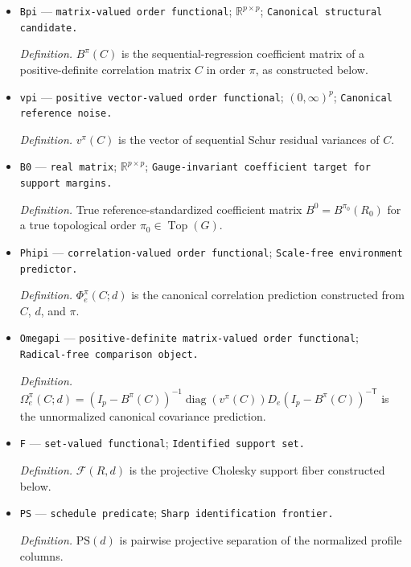 \documentclass{article}
\begin{document}
\begin{itemize}
  \item \texttt{Bpi} --- \texttt{matrix-\allowbreak{}valued order functional}; \(\mathbb R^{p\times p}\); \texttt{Canonical structural candidate.}
  \par\smallskip\noindent\emph{Definition.} \(B^{\pi}(C)\) is the sequential-regression coefficient matrix of a positive-definite correlation matrix \(C\) in order \(\pi\), as constructed below.
  \item \texttt{vpi} --- \texttt{positive vector-\allowbreak{}valued order functional}; \((0,\infty)^p\); \texttt{Canonical reference noise.}
  \par\smallskip\noindent\emph{Definition.} \(v^{\pi}(C)\) is the vector of sequential Schur residual variances of \(C\).
  \item \texttt{B0} --- \texttt{real matrix}; \(\mathbb R^{p\times p}\); \texttt{Gauge-\allowbreak{}invariant coefficient target for support margins.}
  \par\smallskip\noindent\emph{Definition.} True reference-standardized coefficient matrix \(B^0=B^{\pi_0}(R_0)\) for a true topological order \(\pi_0\in\operatorname{Top}(G)\).
  \item \texttt{Phipi} --- \texttt{correlation-\allowbreak{}valued order functional}; \texttt{Scale-\allowbreak{}free environment predictor.}
  \par\smallskip\noindent\emph{Definition.} \(\Phi_e^{\pi}(C;d)\) is the canonical correlation prediction constructed from \(C\), \(d\), and \(\pi\).
  \item \texttt{Omegapi} --- \texttt{positive-\allowbreak{}definite matrix-\allowbreak{}valued order functional}; \texttt{Radical-\allowbreak{}free comparison object.}
  \par\smallskip\noindent\emph{Definition.} \(\Omega_e^{\pi}(C;d)=(I_p-B^{\pi}(C))^{-1}\operatorname{diag}(v^{\pi}(C))D_e(I_p-B^{\pi}(C))^{-\mathsf T}\) is the unnormalized canonical covariance prediction.
  \item \texttt{F} --- \texttt{set-\allowbreak{}valued functional}; \texttt{Identified support set.}
  \par\smallskip\noindent\emph{Definition.} \(\mathcal F(R,d)\) is the projective Cholesky support fiber constructed below.
  \item \texttt{PS} --- \texttt{schedule predicate}; \texttt{Sharp identification frontier.}
  \par\smallskip\noindent\emph{Definition.} \(\mathrm{PS}(d)\) is pairwise projective separation of the normalized profile columns.

\end{itemize}
\end{document}
